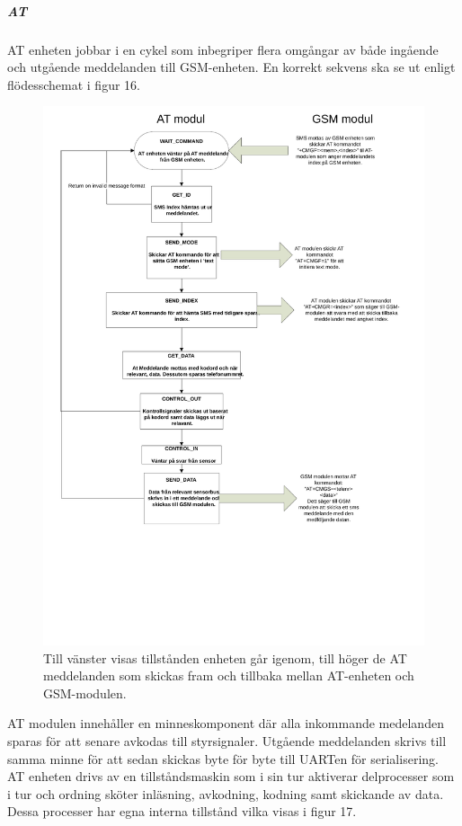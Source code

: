 \documentclass[a4paper]{scrartcl}
\begin{document}
		\subparagraph{AT}
		AT enheten jobbar i en cykel som inbegriper flera omgångar av både ingående och utgående meddelanden till GSM-enheten. En korrekt sekvens ska se ut enligt flödesschemat i figur 16.
		\begin{figure}[H]
			\centering
			\includegraphics[scale=0.4]{atflow.pdf}
			\caption{Till vänster visas tillstånden enheten går igenom, till höger de AT meddelanden som skickas fram och tillbaka mellan AT-enheten och GSM-modulen.}
		\end{figure}

		AT modulen innehåller en minneskomponent där alla inkommande medelanden sparas för att senare avkodas till styrsignaler. Utgående meddelanden skrivs till samma minne för att sedan skickas byte för byte till UARTen för serialisering.
		AT enheten drivs av en tillståndsmaskin som i sin tur aktiverar delprocesser som i tur och ordning sköter inläsning, avkodning, kodning samt skickande av data. Dessa processer har egna interna tillstånd vilka visas i figur 17.
\end{document}

